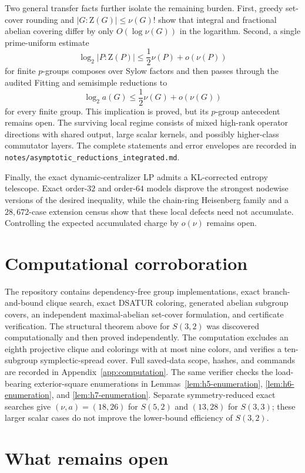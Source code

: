 \documentclass[11pt]{article}
\theoremstyle{remark}
\newcommand{\nuG}{\nu}
\newcommand{\aG}{a}
\newcommand{\Z}{\mathrm Z}
\begin{document}
Two general transfer facts further isolate the remaining burden.  First,
greedy set-cover rounding and $|G:\Z(G)|\le\nuG(G)!$ show that integral and
fractional abelian covering differ by only $O(\log\nuG(G))$ in the
logarithm.  Second, a single prime-uniform estimate
\[
 \log_2|P:\Z(P)|\le\frac12\nuG(P)+o(\nuG(P))
\]
for finite $p$-groups composes over Sylow factors and then passes through
the audited Fitting and semisimple reductions to
\[
 \log_2a(G)\le\frac12\nuG(G)+o(\nuG(G))
\]
for every finite group.  This implication is proved, but its $p$-group
antecedent remains open.  The surviving local regime consists of mixed
high-rank operator directions with shared output, large scalar kernels, and
possibly higher-class commutator layers.  The complete statements and
error envelopes are recorded in
\texttt{notes/asymptotic\_reductions\_integrated.md}.

Finally, the exact dynamic-centralizer LP admits a KL-corrected entropy
telescope.  Exact order-$32$ and order-$64$ models disprove the strongest
nodewise versions of the desired inequality, while the chain-ring
Heisenberg family and a $28{,}672$-case extension census show that these
local defects need not accumulate.  Controlling the expected accumulated
charge by $o(\nuG)$ remains open.

\section{Computational corroboration}

The repository contains dependency-free group implementations, exact
branch-and-bound clique search, exact DSATUR coloring, generated abelian
subgroup covers, an independent maximal-abelian set-cover formulation, and
certificate verification.  The structural theorem above for $S(3,2)$ was
discovered computationally and then proved independently.  The computation
excludes an eighth projective clique and colorings with at most nine colors,
and verifies a ten-subgroup symplectic-spread cover.  Full saved-data scope,
hashes, and commands are recorded in Appendix~\ref{app:computation}.
The same verifier checks the load-bearing exterior-square enumerations in
Lemmas~\ref{lem:h5-enumeration}, \ref{lem:h6-enumeration}, and
\ref{lem:h7-enumeration}.  Separate symmetry-reduced exact searches
give $(\nuG,\aG)=(18,26)$ for $S(5,2)$ and $(13,28)$ for $S(3,3)$; these
larger scalar cases do not improve the lower-bound efficiency of $S(3,2)$.

\section{What remains open}
\end{document}
